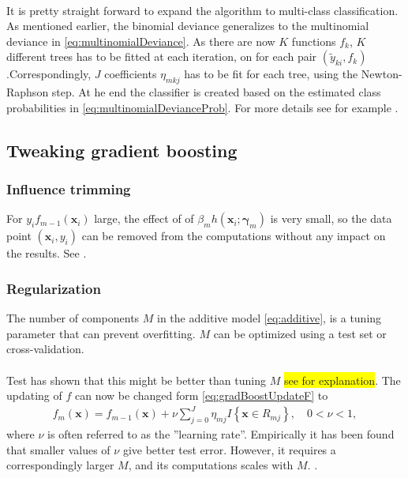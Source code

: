\\
It is pretty straight forward to expand the algorithm to multi-class classification. As mentioned earlier, the binomial deviance generalizes to the multinomial deviance in \eqref{eq:multinomialDeviance}. As there are now $K$ functions $f_k$, $K$ different trees has to be fitted at each iteration, on for each pair $(\tilde y_{k i}, f_k)$.Correspondingly, $J$ coefficients $\eta_{m k j}$ has to be fit for each tree, using the Newton-Raphson step. At he end the classifier is created based on the estimated class probabilities in \eqref{eq:multinomialDevianceProb}. For more details see for example \cite{friedman}.

\subsection{Tweaking gradient boosting}
\label{sub:Tweaking gradient boosting}

\subsubsection{Influence trimming}
\label{sub:Influence trimming}
For $y_i f_{m-1}(\mathbf{x}_i)$ large, the effect of of $\beta_m h(\mathbf{x}_i; \bm{\gamma}_m)$ is very small, so the data point $(\mathbf{x}_i, y_i)$ can be removed from the computations without any impact on the results. See \cite{friedman}.

\subsubsection{Regularization}
\label{sub:Regularizatoin}
The number of components $M$ in the additive model \eqref{eq:additive}, is a tuning parameter that can prevent overfitting. $M$ can be optimized using a test set or cross-validation.\\
\\
Test has shown that this might be better than tuning $M$ \cite{copas1983} \colorbox{yellow}{see \cite{friedman} for explanation}. The updating of $f$ can now be changed form \eqref{eq:gradBoostUpdateF} to 
\begin{align}
  f_m(\mathbf{x}) = f_{m-1}(\mathbf{x}) +  \nu \sum^{J}_{j=0} \eta_{m j} I\left\{ \mathbf{x} \in R_{m j} \right\}, \quad 0 < \nu < 1,
\end{align}
where $\nu$ is often referred to as the ''learning rate''. Empirically it has been found \cite{friedman} that smaller values of $\nu$ give better test error. However, it requires a correspondingly larger $M$, and its computations scales with $M$. \cite{breiman}.

